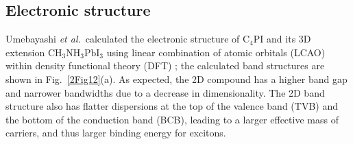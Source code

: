 \subsection{Electronic structure}

Umebayashi \textit{et al.}\ calculated the electronic structure of $\textrm{C}_{4}$PI and its 3D extension $\textrm{CH}_3\textrm{NH}_3\textrm{PbI}_3$ using linear combination of atomic orbitals (LCAO) within density functional theory (DFT) \cite{Umebayashi2003}; the calculated band structures are shown in Fig.\ \ref{2Fig12}(a). As expected, the 2D compound has a higher band gap and narrower bandwidths due to a decrease in dimensionality. The 2D band structure also has flatter dispersions at the top of the valence band (TVB) and the bottom of the conduction band (BCB), leading to a larger effective mass of carriers, and thus larger binding energy for excitons. 

